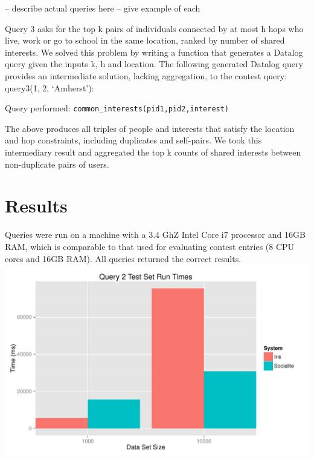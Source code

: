 \documentclass{article}
\begin{document}
\begin{multicols}{2}
-- describe actual queries here
-- give example of each

Query 3 asks for the top k pairs of individuals connected by at most h hops who live, work or go to school in the same location, ranked by number of shared interests. We solved this problem by writing a function that generates a Datalog query given the inputs k, h and location. The following generated Datalog query provides an intermediate solution, lacking aggregation, to the contest query: query3(1, 2, ‘Amherst’):



Query performed: \texttt{common\_interests(pid1,pid2,interest)}

The above produces all triples of people and interests that satisfy the location and hop constraints, including duplicates and self-pairs. We took this intermediary result and aggregated the top k counts of shared interests between non-duplicate pairs of users.																																												
\section{Results}
Queries were run on a machine with a 3.4 GhZ Intel Core i7 processor and 16GB RAM, which is comparable to that used for evaluating contest entries (8 CPU cores and 16GB RAM). All queries returned the correct results.
\begingroup
    \centering
    \includegraphics[scale=0.4]{../results/query2.pdf}
    \label{fig:q2}
\endgroup


\end{multicols}
\end{document}
